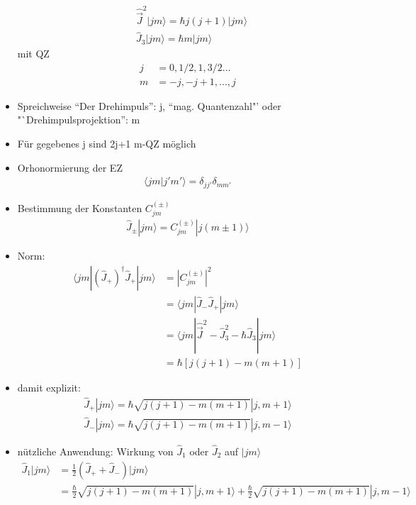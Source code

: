 \documentclass[10pt,article,colorback,accentcolor=tud9d]{scrartcl}
\begin{document}
\begin{itemize}
  \begin{align}
   &\hat{\vec{J}}^2|jm\rangle=\hbar j(j+1)|jm\rangle\\
   &\hat{J}_3|jm\rangle=\hbar m |jm\rangle
  \end{align}
  mit QZ
  \begin{align}
   j&=0,1/2,1,3/2...\\
   m&=-j,-j+1,...,j
  \end{align}
\item Spreichweise ``Der Drehimpuls'': j, ``mag. Quantenzahl"' oder "`Drehimpulsprojektion'': m
\item Für gegebenes j sind 2j+1 m-QZ möglich
\item Orhonormierung der EZ
\begin{align}
 \langle jm|j'm'\rangle=\delta_{jj'}\delta_{mm'}
\end{align}
\item Bestimmung der Konstanten $C_{jm}^{(\pm)}$
\begin{align}
 \hat{J}_\pm|jm\rangle=C_{jm}^{(\pm)}|j(m\pm1)\rangle
\end{align}
\item Norm:
\begin{align}
\langle jm|(\hat{J}_+)^\dagger\hat{J}_+|jm\rangle&=|C_{jm}^{(\pm)}|^2\\
&=\langle jm|\hat{J}_-\hat{J}_+|jm\rangle\\
&=\langle jm|\hat{\vec{J}}^2-\hat{J}_3^2-\hbar\hat{J}_3|jm\rangle\\
&=\hbar[j(j+1)-m(m+1)]
\end{align}
  \item damit explizit:
    \begin{align}
    \hat{J}_+|jm\rangle=\hbar\sqrt{j(j+1)-m(m+1)}|j,m+1\rangle\\
    \hat{J}_-|jm\rangle=\hbar\sqrt{j(j+1)-m(m+1)}|j,m-1\rangle
    \end{align}
  \item nützliche Anwendung: Wirkung von $\hat{J}_1$ oder $\hat{J}_2$ auf $|jm\rangle$
    \begin{align}
    \hat{J}_1|jm\rangle&=\frac{1}{2}(\hat{J}_++\hat{J}_-)|jm\rangle\\
    &=\frac{\hbar}{2}\sqrt{j(j+1)-m(m+1)}|j,m+1\rangle+\frac{\hbar}{2}\sqrt{j(j+1)-m(m+1)}|j,m-1\rangle
    \end{align}
\end{itemize}
\end{document}
